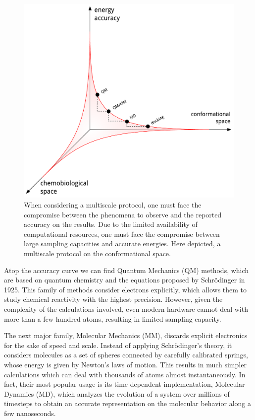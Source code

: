 \begin{figure}
		\includegraphics[width=\textwidth]{./figures/01/thong.pdf}
		\cprotect\caption[Accuracy vs accessible space in multiscale modeling]{When considering a multiscale protocol, one must face the compromise between the phenomena to observe and the reported accuracy on the results. Due to the limited availability of computational resources, one must face the compromise between large sampling capacities and accurate energies. Here depicted, a multiscale protocol on the conformational space.}
		\label{fig:multiscalethong}
\end{figure}


Atop the accuracy curve we can find Quantum Mechanics (QM) methods, which are based on quantum chemistry and the equations proposed by Schrödinger in 1925. This family of methods consider electrons explicitly, which allows them to study chemical reactivity with the highest precision. However, given the complexity of the calculations involved, even modern hardware cannot deal with more than a few hundred atoms, resulting in limited sampling capacity.

The next major family, Molecular Mechanics (MM), discards explicit electronics for the sake of speed and scale. Instead of applying Schrödinger's theory, it considers molecules as a set of spheres connected by carefully calibrated springs, whose energy is given by Newton's laws of motion. This results in much simpler calculations which can deal with thousands of atoms almost instantaneously. In fact, their most popular usage is its time-dependent implementation, Molecular Dynamics (MD), which analyzes the evolution of a system over millions of timesteps to obtain an accurate representation on the molecular behavior along a few nanoseconds.

